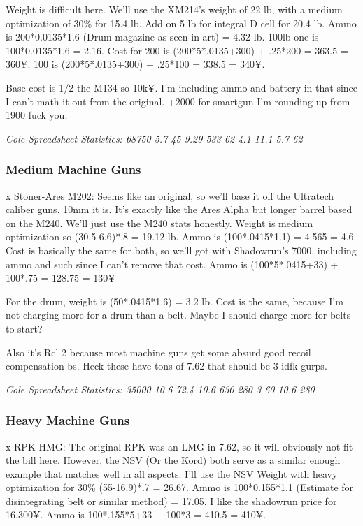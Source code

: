 \begin{multicols*}{2}
	Weight is difficult here. We'll use the XM214's weight of 22 lb, with a medium optimization of 30\% for 15.4 lb. Add on 5 lb for integral D cell for 20.4 lb. Ammo is 200*0.0135*1.6 (Drum magazine as seen in art) = 4.32 lb. 100lb one is 100*0.0135*1.6 = 2.16. Cost for 200 is (200*5*.0135+300) + .25*200 = 363.5 = 360¥. 100 is (200*5*.0135+300) + .25*100 = 338.5 = 340¥.
	
	Base cost is 1/2 the M134 so 10k¥. I'm including ammo and battery in that since I can't math it out from the original. +2000 for smartgun I'm rounding up from 1900 fuck you.
	
	\textit{\textcolor{OliveGreen}{Cole Spreadsheet Statistics: 68750 5.7 45 9.29 533 62 4.1 11.1 5.7 62}}
	
	\subsubsection{Medium Machine Guns}
	
	x Stoner-Ares M202: Seems like an original, so we'll base it off the Ultratech caliber guns. 10mm it is. It's exactly like the Ares Alpha but longer barrel based on the M240. We'll just use the M240 stats honestly. Weight is medium optimization so (30.5-6.6)*.8 = 19.12 lb. Ammo is (100*.0415*1.1) = 4.565 = 4.6. Cost is basically the same for both, so we'll got with Shadowrun's 7000, including ammo and such since I can't remove that cost. Ammo is (100*5*.0415+33) + 100*.75 = 128.75 = 130¥
	
	For the drum, weight is (50*.0415*1.6) = 3.2 lb. Cost is the same, because I'm not charging more for a drum than a belt. Maybe I should charge more for belts to start?
	
	Also it's Rcl 2 because most machine guns get some absurd good recoil compensation bs. Heck these have tons of 7.62 that should be 3 idfk gurps.
	
	\textit{\textcolor{OliveGreen}{Cole Spreadsheet Statistics: 35000 10.6 72.4 10.6 630 280 3 60 10.6 280}}
	
	\subsubsection{Heavy Machine Guns}
	
	x RPK HMG: The original RPK was an LMG in 7.62, so it will obviously not fit the bill here. However, the NSV (Or the Kord) both serve as a similar enough example that matches well in all aspects. I'll use the NSV Weight with heavy optimization for 30\% (55-16.9)*.7 = 26.67. Ammo is  100*0.155*1.1 (Estimate for disintegrating belt or similar method) = 17.05. I like the shadowrun price for 16,300¥. Ammo is 100*.155*5+33 + 100*3 = 410.5 = 410¥.
	

\end{multicols*}
